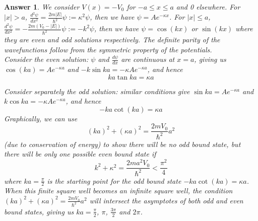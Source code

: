 \documentclass[a4paper]{article}
\newtheorem{ans}{Answer}[section]
\theoremstyle{new}
\begin{document}
\begin{ans}
We consider $V(x)=-V_0$ for $-a\leq x\leq a$ and 0 elsewhere. For $|x|>a$, $\frac{d^2\psi}{dx^2}=\frac{2m|E|}{\hbar^2}\psi:=\kappa^2\psi$, then we have $\psi=Ae^{-\kappa x}$. For $|x|\leq a$, $\frac{d^2\psi}{dx^2}=-\frac{2m(V_0-|E|)}{\hbar^2}\psi:=-k^2\psi$, then we have $\psi=\cos(kx)$ or $\sin(kx)$ where they are even and odd solutions respectively. The definite parity of the wavefunctions follow from the symmetric property of the potentials.\\[5pt]
Consider the even solution: $\psi$ and $\frac{d\psi}{dx}$ are continuous at $x=a$, giving us $\cos(ka)=Ae^{-\kappa a}$ and $-k\sin ka=-\kappa Ae^{-\kappa a}$, and hence $$ka\tan ka=\kappa a$$
\begin{center}
\hfill
{}
\end{center}
Consider separately the odd solution: similar conditions give $\sin ka=Ae^{-\kappa a}$ and $k\cos ka=-\kappa Ae^{-\kappa a}$, and hence $$-ka\cot(ka)=\kappa a$$ Graphically, we can use 
$$(ka)^2+(\kappa a)^2=\frac{2mV_0}{\hbar^2}a^2$$
(due to conservation of energy) to show there will be no odd bound state, but there will be only one possible even bound state if $$k^2+\kappa^2=\frac{2ma^2V_0}{\hbar^2}<\frac{\pi^2}{4}$$
where $ka=\frac{\pi}{2}$ is the starting point for the odd bound state $-ka\cot(ka)=\kappa a$.\\[5pt]
When this finite square well becomes an infinite square well, the condition $(ka)^2+(\kappa a)^2=\frac{2mV_0}{\hbar^2}a^2$ will intersect the asymptotes of both odd and even bound states, giving us $ka=\frac{\pi}{2}$, $\pi$, $\frac{3\pi}{2}$ and $2\pi$.
\end{ans}
\end{document}
